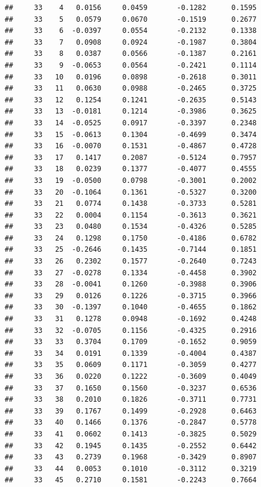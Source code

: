 \documentclass[
]{article}
\begin{document}
\begin{verbatim}
##     33    4   0.0156     0.0459       -0.1282      0.1595  
##     33    5   0.0579     0.0670       -0.1519      0.2677  
##     33    6  -0.0397     0.0554       -0.2132      0.1338  
##     33    7   0.0908     0.0924       -0.1987      0.3804  
##     33    8   0.0387     0.0566       -0.1387      0.2161  
##     33    9  -0.0653     0.0564       -0.2421      0.1114  
##     33   10   0.0196     0.0898       -0.2618      0.3011  
##     33   11   0.0630     0.0988       -0.2465      0.3725  
##     33   12   0.1254     0.1241       -0.2635      0.5143  
##     33   13  -0.0181     0.1214       -0.3986      0.3625  
##     33   14  -0.0525     0.0917       -0.3397      0.2348  
##     33   15  -0.0613     0.1304       -0.4699      0.3474  
##     33   16  -0.0070     0.1531       -0.4867      0.4728  
##     33   17   0.1417     0.2087       -0.5124      0.7957  
##     33   18   0.0239     0.1377       -0.4077      0.4555  
##     33   19  -0.0500     0.0798       -0.3001      0.2002  
##     33   20  -0.1064     0.1361       -0.5327      0.3200  
##     33   21   0.0774     0.1438       -0.3733      0.5281  
##     33   22   0.0004     0.1154       -0.3613      0.3621  
##     33   23   0.0480     0.1534       -0.4326      0.5285  
##     33   24   0.1298     0.1750       -0.4186      0.6782  
##     33   25  -0.2646     0.1435       -0.7144      0.1851  
##     33   26   0.2302     0.1577       -0.2640      0.7243  
##     33   27  -0.0278     0.1334       -0.4458      0.3902  
##     33   28  -0.0041     0.1260       -0.3988      0.3906  
##     33   29   0.0126     0.1226       -0.3715      0.3966  
##     33   30  -0.1397     0.1040       -0.4655      0.1862  
##     33   31   0.1278     0.0948       -0.1692      0.4248  
##     33   32  -0.0705     0.1156       -0.4325      0.2916  
##     33   33   0.3704     0.1709       -0.1652      0.9059  
##     33   34   0.0191     0.1339       -0.4004      0.4387  
##     33   35   0.0609     0.1171       -0.3059      0.4277  
##     33   36   0.0220     0.1222       -0.3609      0.4049  
##     33   37   0.1650     0.1560       -0.3237      0.6536  
##     33   38   0.2010     0.1826       -0.3711      0.7731  
##     33   39   0.1767     0.1499       -0.2928      0.6463  
##     33   40   0.1466     0.1376       -0.2847      0.5778  
##     33   41   0.0602     0.1413       -0.3825      0.5029  
##     33   42   0.1945     0.1435       -0.2552      0.6442  
##     33   43   0.2739     0.1968       -0.3429      0.8907  
##     33   44   0.0053     0.1010       -0.3112      0.3219  
##     33   45   0.2710     0.1581       -0.2243      0.7664  

\end{verbatim}
\end{document}
